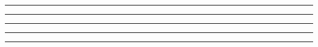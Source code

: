 \begin{problem}{17.8}

\end{problem}

\begin{solution}


\end{solution}

\noindent\rule{7in}{1.5pt}


\begin{problem}{17.9}

\end{problem}

\begin{solution}


\end{solution}

\noindent\rule{7in}{1.5pt}


\begin{problem}{17.10}

\end{problem}

\begin{solution}


\end{solution}

\noindent\rule{7in}{1.5pt}


\begin{problem}{17.11}

\end{problem}

\begin{solution}


\end{solution}

\noindent\rule{7in}{1.5pt}


\begin{problem}{17.12}

\end{problem}

\begin{solution}


\end{solution}

\noindent\rule{7in}{1.5pt}

